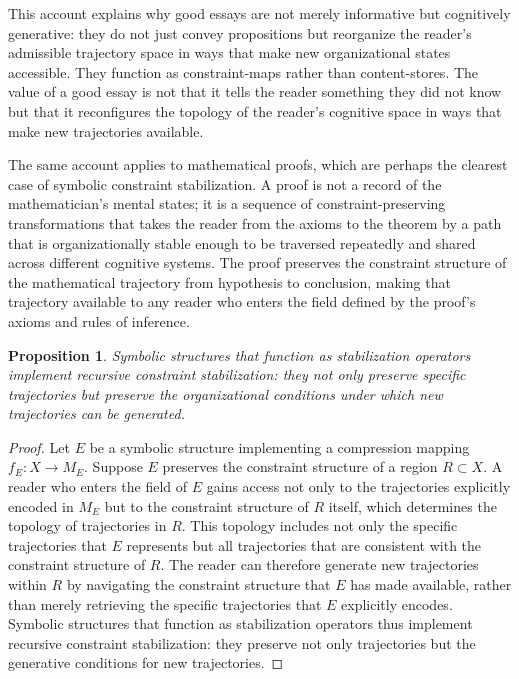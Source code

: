 \documentclass[12pt,a4paper]{report}
\theoremstyle{flyxion}
\newtheorem{proposition}[theorem]{Proposition}
\begin{document}
This account explains why good essays are not merely informative but cognitively generative: they do not just convey propositions but reorganize the reader's admissible trajectory space in ways that make new organizational states accessible. They function as constraint-maps rather than content-stores. The value of a good essay is not that it tells the reader something they did not know but that it reconfigures the topology of the reader's cognitive space in ways that make new trajectories available.

The same account applies to mathematical proofs, which are perhaps the clearest case of symbolic constraint stabilization. A proof is not a record of the mathematician's mental states; it is a sequence of constraint-preserving transformations that takes the reader from the axioms to the theorem by a path that is organizationally stable enough to be traversed repeatedly and shared across different cognitive systems. The proof preserves the constraint structure of the mathematical trajectory from hypothesis to conclusion, making that trajectory available to any reader who enters the field defined by the proof's axioms and rules of inference.

\begin{proposition}
Symbolic structures that function as stabilization operators implement recursive constraint stabilization: they not only preserve specific trajectories but preserve the organizational conditions under which new trajectories can be generated.
\end{proposition}

\begin{proof}
Let $E$ be a symbolic structure implementing a compression mapping $f_E : X \rightarrow M_E$. Suppose $E$ preserves the constraint structure of a region $R \subset X$. A reader who enters the field of $E$ gains access not only to the trajectories explicitly encoded in $M_E$ but to the constraint structure of $R$ itself, which determines the topology of trajectories in $R$. This topology includes not only the specific trajectories that $E$ represents but all trajectories that are consistent with the constraint structure of $R$. The reader can therefore generate new trajectories within $R$ by navigating the constraint structure that $E$ has made available, rather than merely retrieving the specific trajectories that $E$ explicitly encodes. Symbolic structures that function as stabilization operators thus implement recursive constraint stabilization: they preserve not only trajectories but the generative conditions for new trajectories.
\end{proof}
\end{document}
